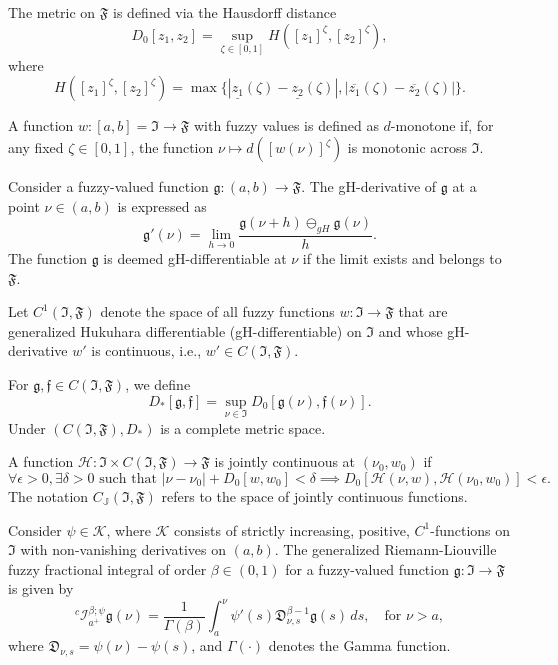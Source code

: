 \documentclass[reqno]{amsart}
\begin{document}
 The metric on \(\mathfrak{F}\) is defined via the Hausdorff distance
\[
 D_0[z_1, z_2] = \sup_{\zeta \in [0,1]} H([z_1]^\zeta, [z_2]^\zeta),
\]
where
$$
 H([z_1]^\zeta, [z_{2}]^\zeta) 
 = \max \{ | \underline{z_1}(\zeta) - \underline{z_2}(\zeta) |,
 | \overline{z_1}(\zeta) - \overline{z_2}(\zeta) | \}.
$$

 A function \( w : [a,b] = \mathfrak{I} \to \mathfrak{F}\) with 
fuzzy values is defined as \(d\)-monotone if, for any fixed \(\zeta \in [0,1]\), 
the function \(\nu \mapsto d([ w(\nu )]^\zeta)\) is monotonic across \(\mathfrak{I}\).

\begin{definition} \label{def1} \rm
Consider a fuzzy-valued function \(\mathfrak{g} : (a, b) \to \mathfrak{F}\). 
The gH-derivative of \(\mathfrak{g}\) at a point \(\nu \in (a, b)\) is expressed as
\begin{equation} \label{e2.3}
\mathfrak{g}'(\nu ) = \lim_{h \to 0} \frac{\mathfrak{g}(\nu + h)
\ominus_{gH} \mathfrak{g}(\nu )}{h}.
\end{equation}
The function \(\mathfrak{g}\) is deemed gH-differentiable at \(\nu \) if the limit
exists and belongs to \(\mathfrak{F}\).
\end{definition}

Let \( C^1(\mathfrak{I}, \mathfrak{F}) \) denote the space of all fuzzy functions 
\( w : \mathfrak{I} \to \mathfrak{F} \) that are generalized Hukuhara differentiable 
(gH-differentiable) on \( \mathfrak{I} \) and whose gH-derivative \( w' \) is 
continuous, i.e., \( w' \in C(\mathfrak{I}, \mathfrak{F}) \).

 For \(\mathfrak{g},\mathfrak{f} \in C(\mathfrak{I}, \mathfrak{F})\), we define
 \[
 D_*[\mathfrak{g}, \mathfrak{f}] 
 = \sup_{\nu \in \mathfrak{I}} D_0[\mathfrak{g}(\nu ),\mathfrak{f}(\nu )].
 \]
 Under \((C(\mathfrak{I}, \mathfrak{F}),D_*)\) is a complete metric space.

 A function \(\mathcal{H}: \mathfrak{I} \times C(\mathfrak{I}, \mathfrak{F}) 
 \to \mathfrak{F}\) is jointly continuous at \((\nu _0, w_0)\) if
 \[
 \forall \epsilon > 0, \exists \delta > 0 \text{ such that } | \nu -\nu _0| + D_0[ w, w_0] < \delta \implies D_0[\mathcal{H}(\nu , w), \mathcal{H}(\nu _0, w_0)] < \epsilon.
 \]
The notation \( C_{\mathbb{J}}(\mathfrak{I}, \mathfrak{F}) \) refers to the 
space of jointly continuous functions.

\begin{definition} \label{def2} \rm
Consider \(\psi \in \mathcal{K}\), where \(\mathcal{K}\) consists of strictly 
increasing, positive, \(C^1\)-functions on \(\mathfrak{I}\) with non-vanishing 
derivatives on \((a, b)\). The generalized Riemann-Liouville fuzzy fractional integral 
of order \(\beta \in (0,1)\) for a fuzzy-valued function 
\(\mathfrak{g} : \mathfrak{I} \to \mathfrak{F}\) is given by
\[
{}^{c}\mathcal{I}_{a^{+}}^{\beta ; \psi} \mathfrak{g}(\nu ) 
= \frac{1}{\Gamma(\beta)} \int_{a}^{\nu } \psi'(s) \mathfrak{D}_{\nu ,s}^{\beta - 1}
 \mathfrak{g}(s) \, ds, \quad \text{for } \nu > a,
\]
where $\mathfrak{D}_{\nu ,s}=\psi(\nu )-\psi(s)$, and \(\Gamma(\cdot)\) denotes the 
Gamma function.
\end{definition}
\end{document}
